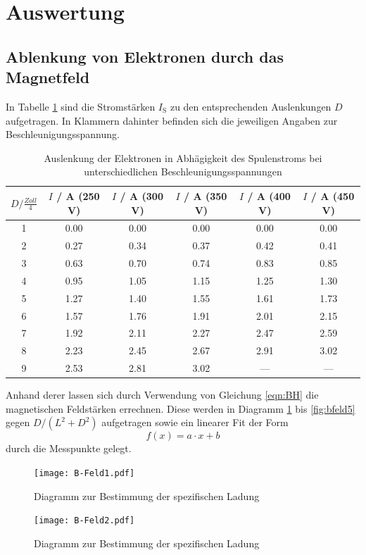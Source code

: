 \section{Auswertung}
\label{sec:Auswertung}
\subsection{Ablenkung von Elektronen durch das Magnetfeld}
In Tabelle \ref{tab:DIS} sind die Stromstärken $I_\text{S}$ zu den entsprechenden Auslenkungen $D$ aufgetragen. In Klammern dahinter befinden sich die jeweiligen Angaben zur Beschleunigungsspannung.
\begin{table}[H]
  \centering
  \begin{tabular}{c| c c c c c }
    \toprule
    $D / \frac{Zoll}{4}$ & $I$ / A (250 V) & $I$ / A (300 V) & $I$ / A (350 V) & $I$ / A (400 V) & $I$ / A (450 V) \\
    \midrule
    1 &	0.00	&0.00	&0.00	&0.00	&0.00	\\
    2 &	0.27	&0.34	&0.37	&0.42	&0.41	\\
    3 &	0.63	&0.70	&0.74	&0.83	&0.85	\\
    4 &	0.95	&1.05	&1.15	&1.25	&1.30	\\
    5 &	1.27	&1.40	&1.55	&1.61	&1.73	\\
    6 &	1.57	&1.76	&1.91	&2.01	&2.15	\\
    7 &	1.92	&2.11 	&2.27	&2.47	&2.59	\\
    8 &	2.23	&2.45	&2.67	&2.91	&3.02	\\
    9 &	2.53	&2.81	&3.02	&---	&---	\\
    \bottomrule
  \end{tabular}
  \caption{Auslenkung der Elektronen in Abhägigkeit des Spulenstroms bei unterschiedlichen Beschleunigungsspannungen}
  \label{tab:DIS}
\end{table}
Anhand derer lassen sich durch Verwendung von Gleichung \eqref{eqn:BH} die magnetischen Feldstärken errechnen. Diese werden in Diagramm \ref{fig:bfeld1} bis \ref{fig:bfeld5} gegen $D/(L^2+D^2)$ aufgetragen sowie ein linearer Fit der Form 
\begin{equation}
  f(x) = a \cdot x + b
  \label{eqn:fit}
\end{equation}
durch die Messpunkte gelegt.
\begin{figure}[H]
  \centering
  \texttt{[image: B-Feld1.pdf]}
  \caption{Diagramm zur Bestimmung der spezifischen Ladung}
  \label{fig:bfeld1}
\end{figure}
\begin{figure}[H]
  \centering
  \texttt{[image: B-Feld2.pdf]}
  \caption{Diagramm zur Bestimmung der spezifischen Ladung} 
  \label{fig:bfeld2}
\end{figure}
